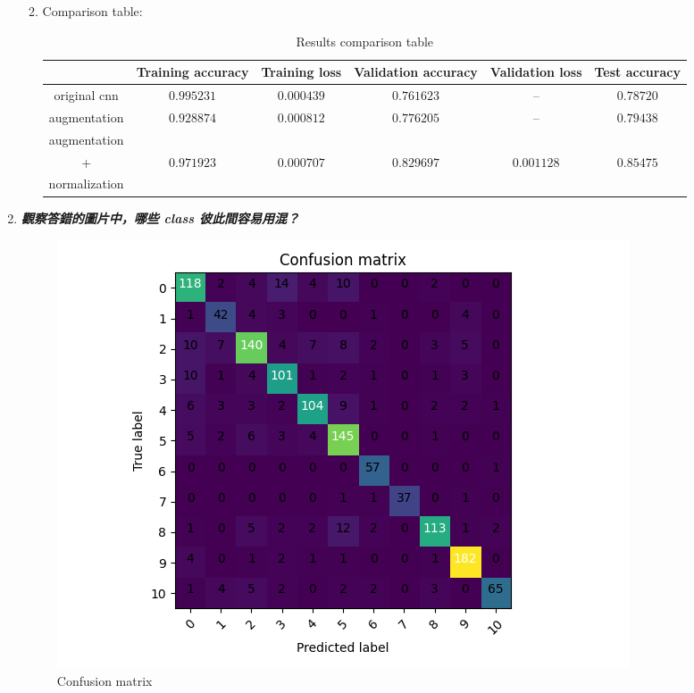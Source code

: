 \documentclass[a4paper,11pt]{article}
\begin{document}
\begin{enumerate}
\begin{enumerate}
\newpage

		\item Comparison table:\\

			\begin{table}[htp]
				\begin{center}
					\begin{tabular}{ | c | c | c | c | c | c |}
					  	\hline
				  		& Training accuracy & Training loss & Validation accuracy & Validation loss & Test accuracy\\[0.5ex] 
				  		\hline \hline
				  		original cnn & $0.995231$ & $0.000439$ & $0.761623$ & -- & $0.78720$ \\[0.2ex]
				  		\hline
				  		augmentation & $0.928874$ & $0.000812$ & $0.776205$ & -- & $0.79438$ \\[0.2ex]
				  		\hline
				  		augmentation & & & & & \\
				  		+ & $0.971923$ & $0.000707$ & $0.829697$ & $0.001128$ & $0.85475$\\
				  		normalization & & & & & \\[0.2ex]
				  		\hline
					\end{tabular}
					\caption{Results comparison table}
				\end{center}
			\end{table}

	\end{enumerate}

	\item \textit{\textbf{觀察答錯的圖片中，哪些 class 彼此間容易用混？}}\\

		\begin{figure}[htp]
		    \begin{center}
		    		\includegraphics[scale=0.75]{./confusion_matrix.png}
		    	\caption{Confusion matrix}
		    \end{center}
		\end{figure}


\end{enumerate}
\end{document}

